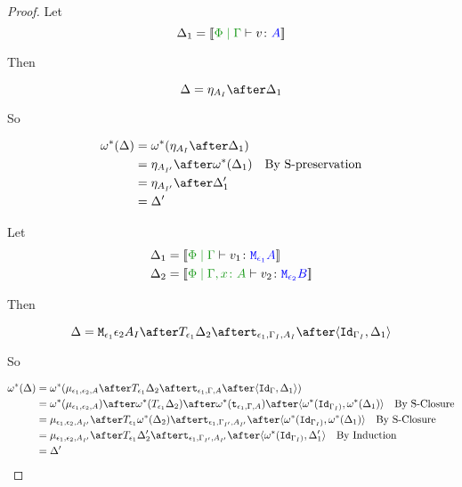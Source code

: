 \documentclass{report}
\begin{document}
\begin{framed}
\begin{proof}
        \case{\vreturn}
        Let \begin{equation}
            \D_1 = \deno{\gpetyperelation{v}{A}}
        \end{equation}
        
        Then
        
        \begin{equation}
            \D = \point{A_I}\after \D_1\\
        \end{equation}
        
        So
        
        \begin{align*}
            \w\star(\D) &= \w\star(\point{A_I}\after \D_1)\\
                    & = \point{A_{I'}} \after\w\star(\D_1)\qt{By S-preservation}\\
                    & = \point{A_{I'}} \after\D_1'\\
                    & = \D'
        \end{align*}
        
        \case{\vbind}
        Let \begin{align*}
            \D_1 &= \deno{\gpetyperelation{v_1}{\M{\e_1}{A}}}\\
            \D_2 &= \deno{\etyperelation{\P}{\gax}{v_2}{\M{\e_2}{B}}}
        \end{align*}
        
        Then
        
        \begin{equation}
            \D = \M{\e_1}{\e_2}{A_I}\after\T{\e_1}{\D_2}\after\tstrength{\e_1}{\G_I}{A_I}\after\pr{\Id{\G_{I}}}{\D_1}\\
        \end{equation}
        
        So
        
        \begin{align*}
            \w\star(\D) &= \w\star(\bind{\e_1}{\e_2}{A}\after\T{\e_1}{\D_2}\after\tstrength{\e_1}{\G}{A}\after\pr{\Id{\G}}{\D_1})\\
            & = \w\star(\bind{\e_1}{\e_2}{A})\after\w\star(\T{\e_1}{\D_2})\after\w\star(\tstrength{\e_1}{\G}{A})\after\pr{\w\star(\Id{\G_{I})}}{\w\star(\D_1)}\qt{By S-Closure}\\
            &= \bind{\e_1}{\e_2}{A_{I'}}\after\T{\e_1}{\w\star(\D_2)}\after\tstrength{\e_1}{\G_{I'}}{A_{I'}}\after\pr{\w\star(\Id{\G_{I})}}{\w\star(\D_1)}\qt{By S-Closure}\\
            &= \bind{\e_1}{\e_2}{A_{I'}}\after\T{\e_1}{\D_2'}\after\tstrength{\e_1}{\G_{I'}}{A_{I'}}\after\pr{\w\star(\Id{\G_{I})}}{\D_1'}\qt{By Induction}\\
            &= \D'\\
        \end{align*}
        

\end{proof}
\end{framed}
\end{document}
